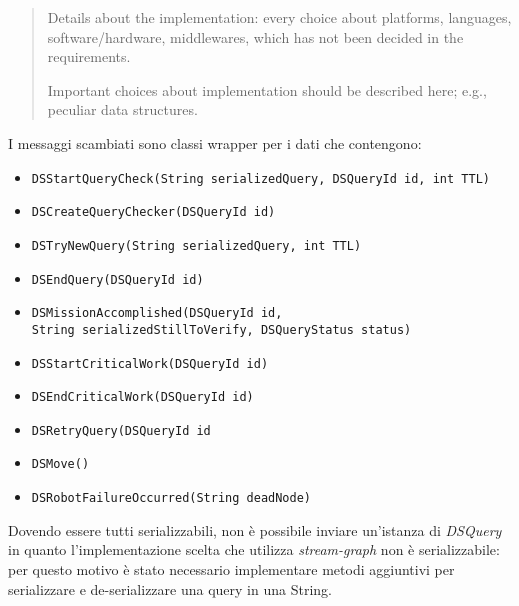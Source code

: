 \begin{quote}
Details about the implementation: every choice about platforms,
languages, software/hardware, middlewares, which has not been decided
in the requirements.

Important choices about implementation should be described here;
e.g., peculiar data structures.
\end{quote}

I messaggi scambiati sono classi wrapper per i dati che contengono:
\begin{itemize}
\item \texttt{DSStartQueryCheck(String serializedQuery, DSQueryId id, int TTL)}
\item \texttt{DSCreateQueryChecker(DSQueryId id)}
\item \texttt{DSTryNewQuery(String serializedQuery, int TTL)}
\item \texttt{DSEndQuery(DSQueryId id)}
\item \texttt{DSMissionAccomplished(DSQueryId id,\\
  \phantom{....}
  String serializedStillToVerify, DSQueryStatus status)}
\item \texttt{DSStartCriticalWork(DSQueryId id)}
\item \texttt{DSEndCriticalWork(DSQueryId id)}
\item \texttt{DSRetryQuery(DSQueryId id}
\item \texttt{DSMove()}
\item \texttt{DSRobotFailureOccurred(String deadNode)}
\end{itemize}

Dovendo essere tutti serializzabili, non è possibile inviare
un'istanza di \emph{DSQuery} in quanto l'implementazione scelta che
utilizza \emph{stream-graph} non è serializzabile:
per questo motivo è stato necessario implementare metodi
aggiuntivi per serializzare e de-serializzare una query in una String.


